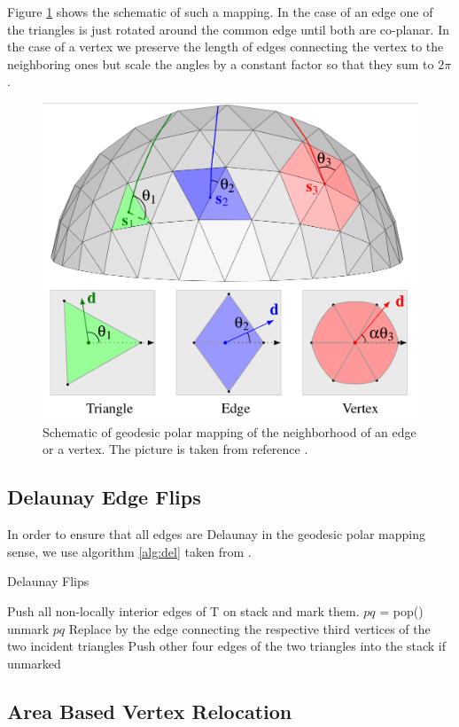 \documentclass[letter,11pt]{article}
\begin{document}
Figure \ref{fig:geo} shows the schematic of such a mapping. In the case
of an edge one of the triangles is just rotated around the common edge
until both are co-planar. In the case of a vertex we preserve the
length of edges connecting the vertex to the neighboring ones but
scale the angles by a constant factor so that they sum to $2\pi$.

\begin{figure}
  \centering
  \includegraphics[width=0.4\linewidth]{../image/geodesic.png}
  \caption{Schematic of geodesic polar mapping of the neighborhood of
    an edge or a vertex. The picture is taken from reference \cite{geodesic}.}
  \label{fig:geo}
\end{figure}

\subsection*{Delaunay Edge Flips}

In order to ensure that all edges are Delaunay in the geodesic polar
mapping sense, we use algorithm \ref{alg:del} taken from \cite{delaunay}.

\begin{algorithm}
  \caption{Delaunay Flips}
  \label{alg:del}
  \begin{algorithmic}[1]
    \State  Push all non-locally interior edges of T on stack and mark them.
    \State $pq$ = pop()
    \State unmark $pq$
    \State Replace by the edge connecting the respective
    third vertices of the two incident triangles
    \State Push other four edges of the two triangles into the stack if unmarked
    \EndIf
    \EndWhile
  \end{algorithmic}
\end{algorithm}

\subsection*{Area Based Vertex Relocation}
\end{document}
